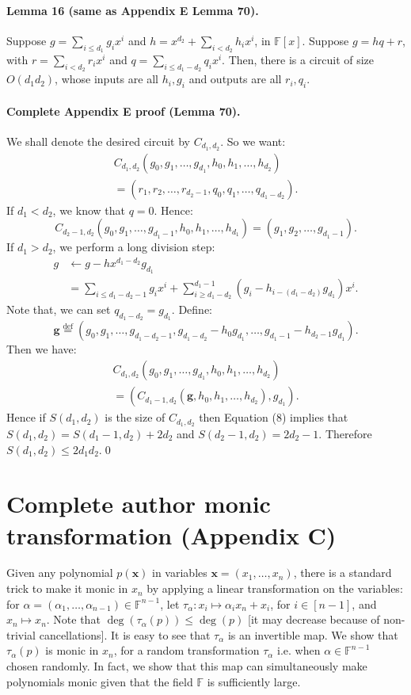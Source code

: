 \documentclass[10pt,a4paper]{article}
\begin{document}
\paragraph{Lemma 16 (same as Appendix E Lemma 70).} Suppose $g=\sum_{i\le d_1}g_ix^i$ and $h=x^{d_2}+\sum_{i<d_2}h_ix^i$, in $\mathbb F[x]$. Suppose $g=hq+r$, with $r=\sum_{i<d_2}r_ix^i$ and $q=\sum_{i\le d_1-d_2}q_ix^i$. Then, there is a circuit of size $O(d_1d_2)$, whose inputs are all $h_i,g_i$ and outputs are all $r_i,q_i$.
\paragraph{Complete Appendix E proof (Lemma 70).} We shall denote the desired circuit by $C_{d_1,d_2}$. So we want:
\begin{multline*}C_{d_1,d_2}(g_0,g_1,\ldots,g_{d_1},h_0,h_1,\ldots,h_{d_2})\\=(r_1,r_2,\ldots,r_{d_2-1},q_0,q_1,\ldots,q_{d_1-d_2}).\end{multline*}
If $d_1<d_2$, we know that $q=0$. Hence:
\[C_{d_2-1,d_2}(g_0,g_1,\ldots,g_{d_1-1},h_0,h_1,\ldots,h_{d_1})=(g_1,g_2,\ldots,g_{d_1-1}).\]
If $d_1>d_2$, we perform a long division step:
\begin{align*}g&\leftarrow g-hx^{d_1-d_2}g_{d_1}\\&=\sum_{i\le d_1-d_2-1}g_ix^i+\sum_{i\ge d_1-d_2}^{d_1-1}(g_i-h_{i-(d_1-d_2)}g_{d_1})x^i.\end{align*}
Note that, we can set $q_{d_1-d_2}=g_{d_1}$. Define:
\[\mathbf g\mathrel{\overset{\mathrm{def}}{=}}(g_0,g_1,\ldots,g_{d_1-d_2-1},g_{d_1-d_2}-h_0g_{d_1},\ldots,g_{d_1-1}-h_{d_2-1}g_{d_1}).\]
Then we have:
\begin{multline*}C_{d_1,d_2}(g_0,g_1,\ldots,g_{d_1},h_0,h_1,\ldots,h_{d_2})\\=(C_{d_1-1,d_2}(\mathbf g,h_0,h_1,\ldots,h_{d_2}),g_{d_1}).\tag{8}\end{multline*}
Hence if $S(d_1,d_2)$ is the size of $C_{d_1,d_2}$ then Equation (8) implies that $S(d_1,d_2)=S(d_1-1,d_2)+2d_2$ and $S(d_2-1,d_2)=2d_2-1$. Therefore $S(d_1,d_2)\le2d_1d_2$.\qed
\section*{Complete author monic transformation (Appendix C)}
Given any polynomial $p(\mathbf x)$ in variables $\mathbf x=(x_1,\ldots,x_n)$, there is a standard trick to make it monic in $x_n$ by applying a linear transformation on the variables: for $\alpha=(\alpha_1,\ldots,\alpha_{n-1})\in\mathbb F^{n-1}$, let $\tau_\alpha:x_i\mapsto\alpha_ix_n+x_i$, for $i\in[n-1]$, and $x_n\mapsto x_n$. Note that $\deg(\tau_\alpha(p))\le\deg(p)$ [it may decrease because of non-trivial cancellations]. It is easy to see that $\tau_\alpha$ is an invertible map. We show that $\tau_\alpha(p)$ is monic in $x_n$, for a random transformation $\tau_\alpha$ i.e. when $\alpha\in\mathbb F^{n-1}$ chosen randomly. In fact, we show that this map can simultaneously make polynomials monic given that the field $\mathbb F$ is sufficiently large.
\end{document}
